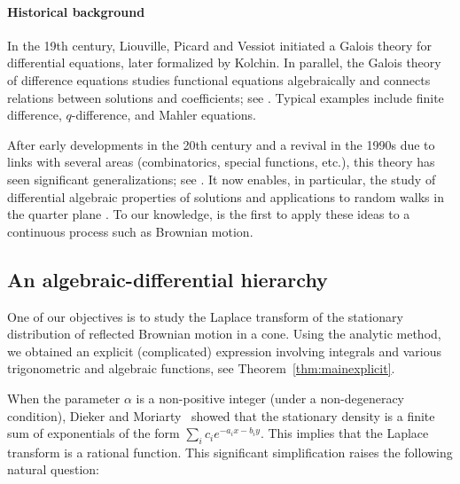 \documentclass[11pt]{article}
\newcommand\citeS[1]{\cite{#1}}
\theoremstyle{definition}
\begin{document}
\paragraph{Historical background}

In the 19th century, Liouville, Picard and Vessiot initiated a Galois theory for differential equations, later formalized by Kolchin. In parallel, the Galois theory of difference equations studies functional equations algebraically and connects relations between solutions and coefficients; see \cite{vdps}. Typical examples include finite difference, $q$-difference, and Mahler equations.

After early developments in the 20th century and a revival in the 1990s due to links with several areas (combinatorics, special functions, etc.), this theory has seen significant generalizations; see \cite{dreyfus_hdr}. It now enables, in particular, the study of differential algebraic properties of solutions and applications to random walks in the quarter plane \cite{DreyfHardtderiv,deryfus_hardouin_roques_singer,DHRS0}. To our knowledge, \citeS{franceschi_bousquet_melou_price_hardouin_raschel_stationary_2023} is the first to apply these ideas to a continuous process such as Brownian motion.



\subsection{An algebraic-differential hierarchy}
\label{sec:algdiffhier}


One of our objectives is to study the Laplace transform of the stationary distribution of reflected Brownian motion in a cone. Using the analytic method, we obtained an explicit (complicated) expression involving integrals and various trigonometric and algebraic functions, see Theorem~\ref{thm:mainexplicit}. 

When the parameter $\alpha$ is a non-positive integer (under a non-degeneracy condition), Dieker and Moriarty~\cite{dieker_reflected_2009} showed that the stationary density is a finite sum of exponentials of the form
$\sum_{i} c_i e^{-a_i x- b_i y}$.
This implies that the Laplace transform is a rational function. This significant simplification raises the following natural question:
\end{document}
